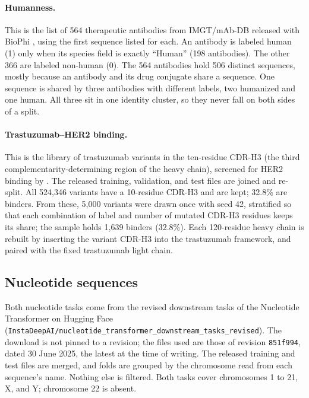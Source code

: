 \paragraph{Humanness.} This is the list of 564 therapeutic antibodies from IMGT/mAb-DB released with BioPhi \citep{Prihoda2022}, using the first sequence listed for each. An antibody is labeled human (1) only when its species field is exactly ``Human'' (198 antibodies). The other 366 are labeled non-human (0). The 564 antibodies hold 506 distinct sequences, mostly because an antibody and its drug conjugate share a sequence. One sequence is shared by three antibodies with different labels, two humanized and one human. All three sit in one identity cluster, so they never fall on both sides of a split.

\paragraph{Trastuzumab--HER2 binding.} This is the library of trastuzumab variants in the ten-residue CDR-H3 (the third complementarity-determining region of the heavy chain), screened for HER2 binding by \citet{Chinery2024}. The released training, validation, and test files are joined and re-split. All 524,346 variants have a 10-residue CDR-H3 and are kept; 32.8\% are binders. From these, 5,000 variants were drawn once with seed 42, stratified so that each combination of label and number of mutated CDR-H3 residues keeps its share; the sample holds 1,639 binders (32.8\%). Each 120-residue heavy chain is rebuilt by inserting the variant CDR-H3 into the trastuzumab framework, and paired with the fixed trastuzumab light chain.

\subsection{Nucleotide sequences}\label{app:datasets:nucleotides}

Both nucleotide tasks come from the revised downstream tasks of the Nucleotide Transformer \citep{DallaTorre2025} on Hugging Face (\nolinkurl{InstaDeepAI/nucleotide_transformer_downstream_tasks_revised}). The download is not pinned to a revision; the files used are those of revision \texttt{851f994}, dated 30 June 2025, the latest at the time of writing. The released training and test files are merged, and folds are grouped by the chromosome read from each sequence's name. Nothing else is filtered. Both tasks cover chromosomes 1 to 21, X, and Y; chromosome 22 is absent.

